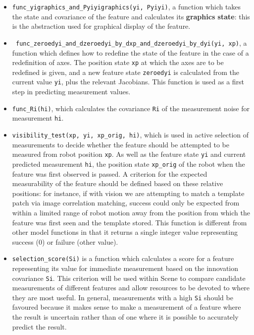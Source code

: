 \documentclass{article}
\begin{document}
\begin{itemize}
\item {\tt func\_yigraphics\_and\_Pyiyigraphics(yi, Pyiyi)}, a
  function which takes the state and covariance of the feature and
  calculates its {\bf graphics state}: this is the abstraction used
  for graphical display of the feature.
\item {\tt
    func\_zeroedyi\_and\_dzeroedyi\_by\_dxp\_and\_dzeroedyi\_by\_dyi(yi,
    xp)}, a function which defines how to redefine the state of the
  feature in the case of a redefinition of axes. The position state
  {\tt xp} at which the axes are to be redefined is given, and a new
  feature state {\tt zeroedyi} is calculated from the current value
  {\tt yi}, plus the relevant Jacobians. This function is used as a
  first step in predicting measurement values.
\item {\tt func\_Ri(hi)}, which calculates the covariance {\tt Ri} of
  the measurement noise for measurement {\tt hi}.
\item {\tt visibility\_test(xp, yi, xp\_orig, hi)}, which is used in
  active selection of measurements to decide whether the feature
  should be attempted to be measured from robot position {\tt xp}. As
  well as the feature state {\tt yi} and current predicted measurement
  {\tt hi}, the position state {\tt xp\_orig} of the robot when the
  feature was first observed is passed. A criterion for the expected
  measurability of the feature should be defined based on these
  relative positions: for instance, if with vision we are attempting
  to match a template patch via image correlation matching, success
  could only be expected from within a limited range of robot motion
  away from the position from which the feature was first seen and the
  template stored.  This function is different from other model
  functions in that it returns a single integer value representing
  success (0) or failure (other value).
\item {\tt selection\_score(Si)} is a function which calculates a
  score for a feature representing its value for immediate measurement
  based on the innovation covariance {\tt Si}. This criterion will be
  used within Scene to compare candidate measurements of different
  features and allow resources to be devoted to where they are most
  useful. In general, measurements with a high {\tt Si} should be
  favoured because it makes sense to make a measurement of a feature
  where the result is uncertain rather than of one where it is
  possible to accurately predict the result.  
\end{itemize}
\end{document}
